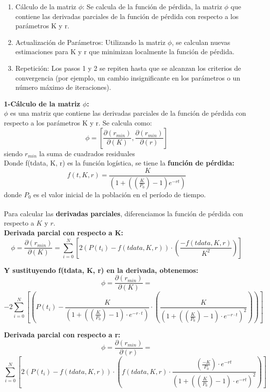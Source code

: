 \documentclass[a4paper,10pt,twocolumn]{article}
\begin{document}
\begin{enumerate}
	\item \small{Cálculo de la matriz $\phi$: Se calcula de la función de pérdida, la matriz $\phi$ que contiene las derivadas parciales de la función de pérdida con respecto a los parámetros K y r.}
	\item \small{Actualización de Parámetros: Utilizando la matriz $\phi$, se calculan nuevas estimaciones para K y r que minimizan localmente la función de pérdida.}
	\item \small{Repetición: Los pasos 1 y 2 se repiten hasta que se alcanzan los criterios de convergencia (por ejemplo, un cambio insignificante en los parámetros o un número máximo de iteraciones).}
\end{enumerate}

\textbf{1-Cálculo de la matriz $\phi$:}\\
$\phi$ es una matriz que contiene las derivadas parciales de la función de pérdida con respecto a los parámetros K y r. Se calcula como: 
	$$\phi = [\frac{\partial(r_{min})}{\partial(K)}, \frac{\partial(r_{min})}{\partial(r)}]$$
\small{siendo $r_{min}$ la suma de cuadrados residuales}\\

Donde f(tdata, K, r) es la función logística, se tiene la \textbf{función de pérdida:}
$$f(t, K, r) = \frac{K}{(1 + ((\frac{K}{P_{0}}) - 1)e^{-rt})}$$
donde $P_{0}$ es el valor inicial de la población en el período de tiempo. \\\\
\small{Para calcular las \textbf{derivadas parciales}, diferenciamos la función de pérdida con respecto a $K$ y $r$.\\}
\textbf{Derivada parcial con respecto a K:}
\small{$$\phi = \frac{\partial(r_{min})}{\partial(K)} = \sum_{i=0}^{N}[2(P(t_{i}) - f(tdata, K, r)) \cdot (\frac{-f(tdata, K, r)}{K^{2}})]$$}

\textbf{Y sustituyendo  f(tdata, K, r) en la derivada, obtenemos:}
\small{$$\phi = \frac{\partial(r_{min})}{\partial(K)} =$$} 
\small{$$-2\sum_{i=0}^{N}[(P(t_{i}) - \frac{K}{(1 + ((\frac{K}{P_{0}}) - 1) \cdot e^{-r \cdot t})} \cdot (\frac{K}{(1 + ((\frac{K}{P_{0}}) - 1) \cdot e^{-r \cdot t})^{2}}))]$$}    

\small{\textbf{Derivada parcial con respecto a r:}}
$$\phi = \frac{\partial(r_{min})}{\partial(r)} = $$ 
\tiny{$$\sum_{i=0}^{N}[2(P(t_{i}) - f(tdata, K, r)) \cdot (f(tdata, K, r) \cdot \frac{(\frac{-K}{P_{0}}) \cdot e^{-rt}}{(1 + ((\frac{K}{P_{0}}) - 1) \cdot e^{-rt})^{2}})]$$}
\end{document}
